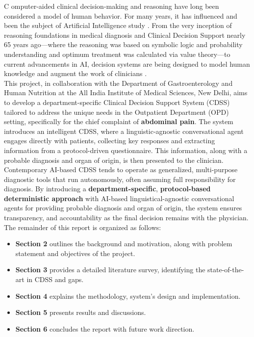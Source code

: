 \lettrine{C}{ }omputer-aided clinical decision-making and reasoning have long been considered a model of human behavior. For many years, it has influenced and been the subject of Artificial Intelligence study \cite{cohen2022introducing}. From the very inception of reasoning foundations in medical diagnosis and Clinical Decision Support nearly 65 years ago---where the reasoning was based on symbolic logic and probability understanding and optimum treatment was calculated via value theory---to current advancements in AI, decision systems are being designed to model human knowledge and augment the work of clinicians \cite{ledley1959reasoning, rajkomar2019machine}.\\

\noindent This project, in collaboration with the Department of Gastroenterology and Human Nutrition at the All India Institute of Medical Sciences, New Delhi, aims to develop a department-specific Clinical Decision Support System (CDSS) tailored to address the unique needs in the Outpatient Department (OPD) setting, specifically for the chief complaint of \textcolor{TUMRed}{\textbf{abdominal pain}}. The system introduces an intelligent CDSS, where a linguistic-agnostic conversational agent engages directly with patients, collecting key responses and extracting information from a protocol-driven questionnaire. This information, along with a probable diagnosis and organ of origin, is then presented to the clinician.\\

\noindent Contemporary AI-based CDSS tends to operate as generalized, multi-purpose diagnostic tools that run autonomously, often assuming full responsibility for diagnosis. By introducing a \textcolor{TUMRed}{\textbf{department-specific}}, \textcolor{TUMRed}{\textbf{protocol-based deterministic approach}} with AI-based linguistical-agnostic conversational agents for providing probable diagnosis and organ of origin, the system ensures transparency, and accountability as the final decision remains with the physician.\\

\noindent The remainder of this report is organized as follows:
\begin{itemize}
    \item \textcolor{TUMRed}{\textbf{Section 2}} outlines the background and motivation, along with problem statement and objectives of the project.
    \item \textcolor{TUMRed}{\textbf{Section 3}} provides a detailed literature survey, identifying the state-of-the-art in CDSS and gaps.
    \item \textcolor{TUMRed}{\textbf{Section 4}} explains the methodology, system's design and implementation.
    \item \textcolor{TUMRed}{\textbf{Section 5}} presents results and discussions.
    \item \textcolor{TUMRed}{\textbf{Section 6}} concludes the report with future work direction.
\end{itemize}